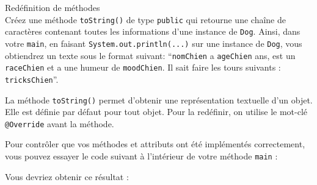 \begin{Exercice}[5 minutes] Redéfinition de méthodes\\
    Créez une méthode \lstinline{toString()} de type \lstinline{public} qui retourne une chaîne de caractères contenant toutes les informations d'une instance de \lstinline{Dog}. Ainsi, dans votre \lstinline{main}, en faisant \lstinline{System.out.println(...)} sur une instance de \lstinline{Dog}, vous obtiendrez un texte sous le format suivant: 
    ``\lstinline{nomChien} a \lstinline{ageChien} ans, est un \lstinline{raceChien} et a une humeur de \lstinline{moodChien}. Il sait faire les tours suivants : \lstinline{tricksChien}''.

    \begin{conseil}
        La méthode \lstinline{toString()} permet d'obtenir une représentation textuelle d'un objet. Elle est définie par défaut pour tout objet. Pour la redéfinir, on utilise le mot-clé \lstinline{@Override} avant la méthode.
    \end{conseil}

    \begin{solution}
        
    \end{solution}
\end{Exercice}
Pour contrôler que vos méthodes et attributs ont été implémentés correctement, vous pouvez essayer le code suivant à l'intérieur de votre méthode \lstinline{main} :
	
	
Vous devriez obtenir ce résultat :
    


\newpage
